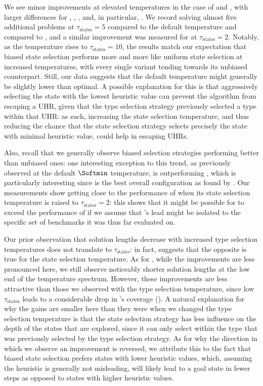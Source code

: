 We see minor improvements at elevated temperatures in the case of \hiHh and \lwDh, with larger differences for \hiUh, \hiDh, \lwHh, and, in particular, \lwUh. We record \hiUh solving almost five additional problems at $\tau_\text{states}=5$ compared to the default temperature and compared to \hiUu, and a similar improvement was measured for \lwHh at $\tau_\text{states}=2$. Notably, as the temperature rises to $\tau_\text{states}=10$, the results match our expectation that biased state selection performs more and more like uniform state selection at increased temperatures, with every single variant tending towards its unbiased counterpart. Still, our data suggests that the default temperature might generally be slightly lower than optimal. A possible explanation for this is that aggressively selecting the state with the lowest heuristic value can prevent the algorithm from escaping a UHR, given that the type selection strategy previously selected a type within that UHR: as such, increasing the state selection temperature, and thus reducing the chance that the state selection strategy selects precisely the state with minimal heuristic value, could help in escaping UHRs.

Also, recall that we generally observe biased selection strategies performing better than unbiased ones: one interesting exception to this trend, as previously observed at the default $\Softmin$ temperature, is \hiDu outperforming \hiDh, which is particularly interesting since \hiDu is the best overall configuration as found by . Our measurements show \hiDh getting close to the performance of \hiDu when its state selection temperature is raised to $\tau_\text{states}=2$: this shows that it might be possible for \hiDh to exceed the performance of \hiDu if we assume that \hiDu's lead might be isolated to the specific set of benchmarks it was thus far evaluated on.

Our prior observation that solution lengths decrease with increased type selection temperatures does not translate to $\tau_\text{states}$: in fact,  suggests that the opposite is true for the state selection temperature. As for \hiDh, while the improvements are less pronounced here, we still observe noticeably shorter solution lengths at the low end of the temperature spectrum. However, these improvements are less attractive than those we observed with the type selection temperature, since low $\tau_\text{states}$ leads to a considerable drop in \hiDh's coverage (). A natural explanation for why the gains are smaller here than they were when we changed the type selection temperature is that the state selection strategy has less influence on the depth of the states that are explored, since it can only select within the type that was previously selected by the type selection strategy. As for why the direction in which we observe an improvement is reversed, we attribute this to the fact that biased state selection prefers states with lower heuristic values, which, assuming the heuristic is generally not misleading, will likely lead to a goal state in fewer steps as opposed to states with higher heuristic values.


